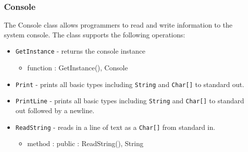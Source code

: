 \documentclass[12pt]{article}
\begin{document}
\subsubsection{Console}
The Console class allows programmers to read and write information to the system console.    The class supports the following operations:
\begin{itemize}
    \item \texttt{GetInstance} - returns the console instance
    	\begin{itemize}
	\item function : GetInstance(), Console
	\end{itemize}
    \item \texttt{Print} - prints all basic types including \texttt{String} and \texttt{Char[]} to standard out.
    \item \texttt{PrintLine} - prints all basic types including \texttt{String} and \texttt{Char[]} to standard out followed by a newline.
    \item \texttt{ReadString} - reads in a line of text as a \texttt{Char[]} from standard in.
    	\begin{itemize}
	\item method : public : ReadString(), String
	\end{itemize}
\end{itemize}
\end{document}
